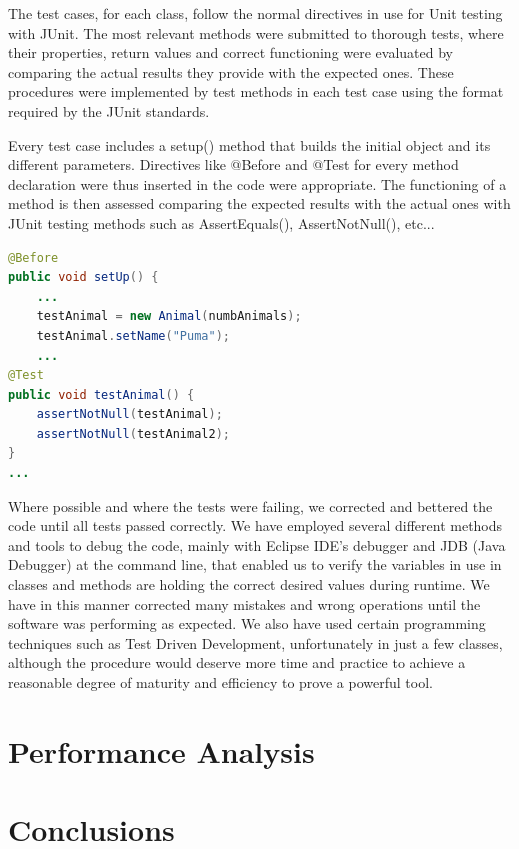 \documentclass[11pt]{report}
\begin{document}
The test cases, for each class, follow the normal directives in use for Unit testing with JUnit. The most relevant methods were submitted to thorough tests, where their properties, return values and correct functioning were evaluated by comparing the actual results they provide with the expected ones. These procedures were implemented by test methods in each test case using the format required by the JUnit standards. 

Every test case includes a setup() method that builds the initial object and its different parameters. Directives like @Before and @Test for every method declaration were thus inserted in the code were appropriate. The functioning of a method is then assessed comparing the expected results with the actual ones with JUnit testing methods such as AssertEquals(), AssertNotNull(), etc...

\begin{lstlisting}[language=Java,caption= Use of JUnit directives in test cases]
@Before
public void setUp() {
    ...
    testAnimal = new Animal(numbAnimals);
    testAnimal.setName("Puma");
    ...
@Test
public void testAnimal() {
    assertNotNull(testAnimal);
    assertNotNull(testAnimal2);
} 
...
\end{lstlisting}

Where possible and where the tests were failing, we corrected and bettered the code until all tests passed correctly. We have employed several different methods and tools to debug the code, mainly with Eclipse IDE's debugger and JDB (Java Debugger) at the command line, that enabled us to verify the variables in use in classes and methods are holding the correct desired values during runtime. We have in this manner corrected many mistakes and wrong operations until the software was performing as expected. We also have used certain programming techniques such as Test Driven Development, unfortunately in just a few classes, although the procedure would deserve more time and practice to achieve a reasonable degree of maturity and efficiency to prove a powerful tool. 

\chapter{Performance Analysis}

   

\chapter{Conclusions} %
\end{document}
